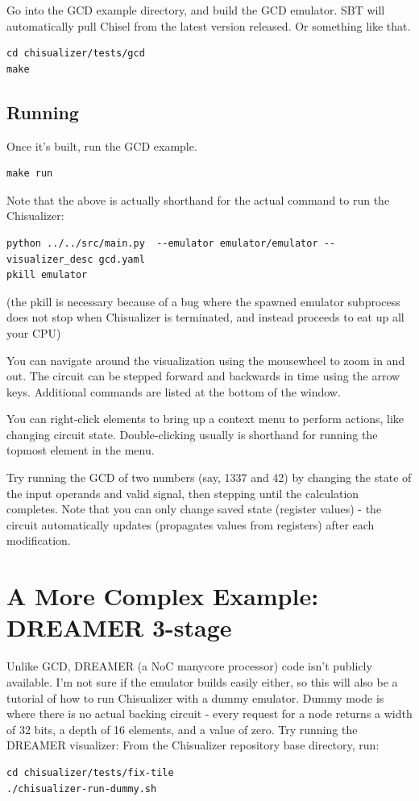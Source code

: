 \documentclass[11pt]{article}
\begin{document}
Go into the GCD example directory, and build the GCD emulator. SBT will automatically pull Chisel from the latest version released. Or something like that.
\begin{verbatim}
cd chisualizer/tests/gcd
make
\end{verbatim}

\subsection{Running}
Once it's built, run the GCD example.
\begin{verbatim}
make run
\end{verbatim}

Note that the above is actually shorthand for the actual command to run the Chisualizer:
\begin{verbatim}
python ../../src/main.py  --emulator emulator/emulator --visualizer_desc gcd.yaml
pkill emulator
\end{verbatim}

(the pkill is necessary because of a bug where the spawned emulator subprocess does not stop when Chisualizer is terminated, and instead proceeds to eat up all your CPU)

You can navigate around the visualization using the mousewheel to zoom in and out. The circuit can be stepped forward and backwards in time using the arrow keys. Additional commands are listed at the bottom of the window.

You can right-click elements to bring up a context menu to perform actions, like changing circuit state. Double-clicking usually is shorthand for running the topmost element in the menu.

Try running the GCD of two numbers (say, 1337 and 42) by changing the state of the input operands and valid signal, then stepping until the calculation completes. Note that you can only change saved state (register values) - the circuit automatically updates (propagates values from registers) after each modification.

\section{A More Complex Example: DREAMER 3-stage}
Unlike GCD, DREAMER (a NoC manycore processor) code isn't publicly available. I'm not sure if the emulator builds easily either, so this will also be a tutorial of how to run Chisualizer with a dummy emulator. Dummy mode is where there is no actual backing circuit - every request for a node returns a width of 32 bits, a depth of 16 elements, and a value of zero. Try running the DREAMER visualizer:
From the Chisualizer repository base directory, run:
\begin{verbatim}
cd chisualizer/tests/fix-tile
./chisualizer-run-dummy.sh
\end{verbatim}
\end{document}
